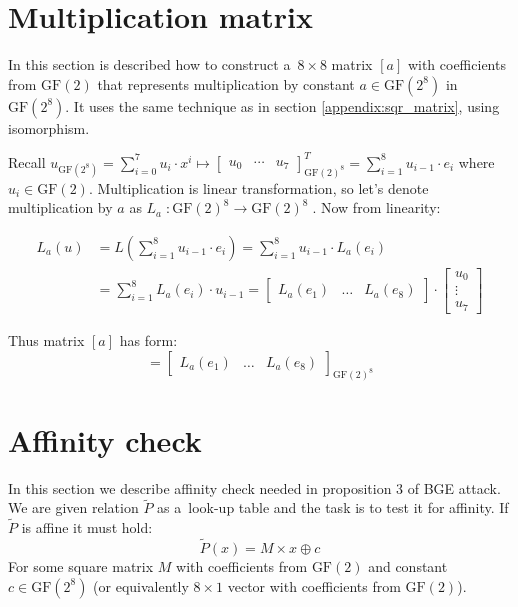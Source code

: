 \documentclass[11pt,oneside,final]{fithesis2}
\newcommand{\gfe}{\ensuremath{\text{GF}\left(2^8\right)}}
\newcommand{\gf}{\ensuremath{\text{GF}\left(2\right)}}
\begin{document}
    \section{Multiplication matrix}\label{appendix:mult_matrix}
    In this section is described how to construct a~$8 \times 8$ matrix $[a]$ with coefficients from $\gf$ that represents multiplication by 
    constant $a \in \gfe$ in $\gfe$. It uses the same technique as in section \ref{appendix:sqr_matrix}, using isomorphism.
    
    Recall $u_{\gfe} = \sum_{i=0}^{7} u_i \cdot x^i \mapsto \begin{bmatrix} u_0 & \cdots & u_7\end{bmatrix}^T_{\gf^8} = \sum_{i=1}^8 u_{i-1} \cdot e_i$
    where $u_i \in \gf$. Multiplication is linear transformation, so let's denote multiplication by $a$ as $L_a \; : \gf^8 \rightarrow \gf^8\; $.
    Now from linearity: 
    
    \begin{align*}
	L_a(u) &= L\left(\sum_{i=1}^8 u_{i-1} \cdot e_i\right) = \sum_{i=1}^8 u_{i-1} \cdot L_a(e_i) \\
	       &= \sum_{i=1}^8 L_a(e_i) \cdot u_{i-1} 
	        = \begin{bmatrix} L_a\left(e_1\right) & \dots & L_a\left(e_8\right) \end{bmatrix} \cdot 
		  \begin{bmatrix} 
		    u_0\\
		    \vdots\\
		    u_7
		  \end{bmatrix} 
    \end{align*}
    
    Thus matrix $[a]$ has form:
    \begin{equation*}
     [a] = \begin{bmatrix} L_a\left(e_1\right) & \dots & L_a\left(e_8\right) \end{bmatrix}_{\gf^8}
    \end{equation*}


    \section{Affinity check}\label{appendix:affcheck}
    In this section we describe affinity check needed in proposition 3 of BGE attack. We are given relation $\widetilde{P}$ as a~look-up table
    and the task is to test it for affinity. If $\widetilde{P}$ is affine it must hold:
    \begin{equation}
	\widetilde{P}\left(x\right) = M \times x \oplus c
    \end{equation}
    For some square matrix $M$ with coefficients from $\text{GF}(2)$ and constant $c \in \gfe$ (or equivalently $8\times1$ vector with coefficients from $\text{GF}(2)$).\\
    
\end{document}

